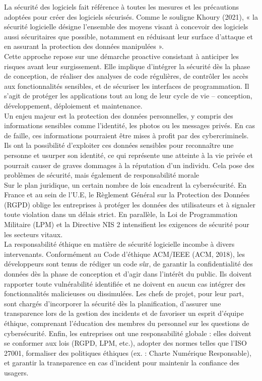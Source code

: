\documentclass{article}
\begin{document}
La sécurité des logiciels fait référence à toutes les mesures et les précautions adoptées pour
créer des logiciels sécurisés. Comme le souligne Khoury (2021),
« la sécurité logicielle désigne
l’ensemble des moyens visant à concevoir des logiciels aussi sécuritaires que possible,
notamment en réduisant leur surface d’attaque et en assurant la protection des données
manipulées ».\\

Cette approche repose sur une démarche proactive consistant à anticiper les risques avant leur
surgissement. Elle implique d'intégrer la sécurité dès la phase de conception, de réaliser des
analyses de code régulières, de contrôler les accès aux fonctionnalités sensibles, et de sécuriser
les interfaces de programmation. Il s’agit de protéger les applications tout au long de leur cycle
de vie – conception, développement, déploiement et maintenance.\\

Un enjeu majeur est la protection des données personnelles, y compris des informations
sensibles comme l’identité, les photos ou les messages privés. En cas de faille, ces informations
pourraient être mises à profit par des cybercriminels. Ils ont la possibilité d'exploiter ces
données sensibles pour reconnaître une personne et usurper son identité, ce qui représente une
atteinte à la vie privée et pourrait causer de graves dommages à la réputation d'un individu.
Cela pose des problèmes de sécurité, mais également de responsabilité morale\\

Sur le plan juridique, un certain nombre de lois encadrent la cybersécurité. En France et au sein
de l’U.E, le Règlement Général sur la Protection des Données (RGPD) oblige les entreprises à
protéger les données des utilisateurs et à signaler toute violation dans un délais strict. En
parallèle, la Loi de Programmation Militaire (LPM) et la Directive NIS 2 intensifient les exigences
de sécurité pour les secteurs vitaux.\\

La responsabilité éthique en matière de sécurité logicielle incombe à divers intervenants.
Conformément au Code d'éthique ACM/IEEE (ACM, 2018), les développeurs sont tenus de
rédiger un code sûr, de garantir la confidentialité des données dès la phase de conception et
d'agir dans l'intérêt du public. Ils doivent rapporter toute vulnérabilité identifiée et ne doivent
en aucun cas intégrer des fonctionnalités malicieuses ou dissimulées. Les chefs de projet, pour
leur part, sont chargés d’incorporer la sécurité dès la planification, d’assurer une transparence
lors de la gestion des incidents et de favoriser un esprit d'équipe éthique, comprenant
l'éducation des membres du personnel sur les questions de cybersécurité. Enfin, les entreprises
ont une responsabilité globale : elles doivent se conformer aux lois (RGPD, LPM, etc.), adopter
des normes telles que l’ISO 27001, formaliser des politiques éthiques (ex. : Charte Numérique
Responsable), et garantir la transparence en cas d’incident pour maintenir la confiance des
usagers.\\
\end{document}

